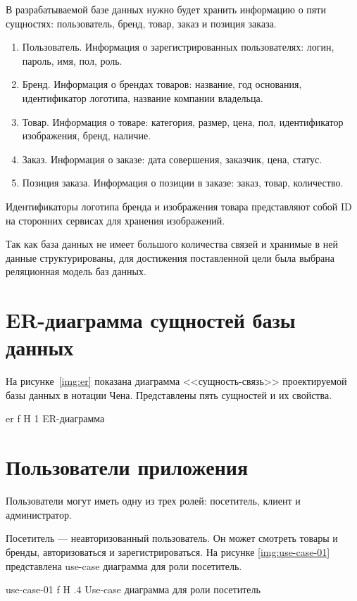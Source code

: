 \documentclass{bmstu}
\begin{document}
В разрабатываемой базе данных нужно будет хранить информацию о пяти сущностях: пользователь, бренд, товар, заказ и позиция заказа.
\begin{enumerate}
\item Пользователь. 
Информация о зарегистрированных пользователях: логин, пароль, имя, пол, роль.
\item Бренд. 
Информация о брендах товаров: название, год основания, идентификатор логотипа, название компании владельца.
\item Товар. 
Информация о товаре: категория, размер, цена, пол, идентификатор изображения, бренд, наличие.

\pagebreak

\item Заказ.
Информация о заказе: дата совершения, заказчик, цена, статус.
\item Позиция заказа.
Информация о позиции в заказе: заказ, товар, количество.
\end{enumerate}

Идентификаторы логотипа бренда и изображения товара представляют собой ID на сторонних сервисах для хранения изображений.

Так как база данных не имеет большого количества связей и хранимые в ней данные структурированы, для достижения поставленной цели была выбрана реляционная модель баз данных.

\section{ER-диаграмма сущностей базы данных}

На рисунке~\ref{img:er} показана диаграмма <<сущность-связь>> проектируемой базы данных в нотации Чена. 
Представлены пять сущностей и их свойства.

    {er}
    {f}
    {H}
    {1\textwidth}
    {ER-диаграмма}
    
\section{Пользователи приложения}

Пользователи могут иметь одну из трех ролей: посетитель, клиент и администратор.

Посетитель --- неавторизованный пользователь. 
Он может смотреть товары и бренды, авторизоваться и зарегистрироваться. На рисунке \ref{img:use-case-01} представлена use-case диаграмма для роли посетитель.

{use-case-01}
{f}
{H}
{.4\textwidth}
{Use-case диаграмма для роли посетитель}
\end{document}
